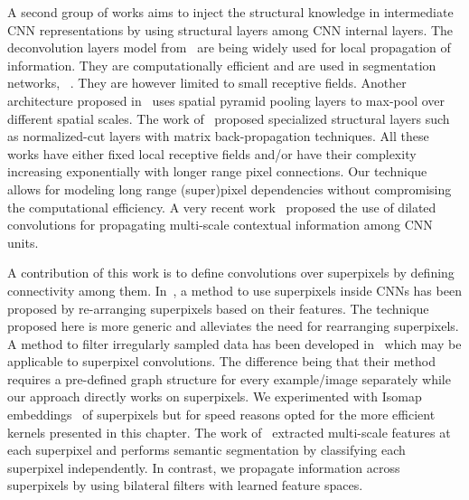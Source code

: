 A second group of works aims to inject the structural knowledge in intermediate
CNN representations by using structural layers among CNN internal layers.
The deconvolution layers model from~\cite{zeiler2010deconvolutional}
are being widely used for local propagation of information.
They are computationally efficient and are used in segmentation networks, \eg~\cite{long2014fully}.
They are however limited to small receptive fields. Another
architecture proposed in~\cite{he2014spatial} uses spatial pyramid pooling layers to max-pool
over different spatial scales. The work of~\cite{ionescu2015matrix} proposed specialized
structural layers such as normalized-cut layers with matrix back-propagation techniques.
All these works have either fixed local receptive fields and/or have their complexity increasing exponentially with longer range pixel connections.
Our technique allows for modeling long range (super)pixel dependencies without compromising the computational efficiency.
A very recent work~\cite{yu2015multi} proposed the use of dilated convolutions
for propagating multi-scale contextual information among CNN units.

A contribution of this work is to define convolutions over superpixels by defining
connectivity among them. In~\cite{he2015supercnn}, a method to use superpixels
inside CNNs has been proposed by re-arranging superpixels based on their
features. The technique proposed here is more generic and alleviates the need
for rearranging superpixels. A method to filter irregularly sampled data has been developed
in~\cite{bruna2013spectral} which may be applicable to superpixel convolutions. The difference
being that their method requires a pre-defined graph structure for every example/image
separately while our approach directly works on superpixels.
We experimented with Isomap embeddings~\cite{tenenbaum2000global} of superpixels but for speed reasons
opted for the more efficient kernels presented in this chapter. The work of~\cite{mostajabi2014feedforward}
extracted multi-scale features at each superpixel and performs semantic segmentation
by classifying each superpixel independently. In contrast, we propagate
information across superpixels by using bilateral filters with learned feature
spaces.

